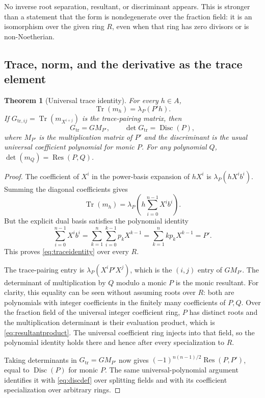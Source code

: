 \documentclass[11pt,letterpaper]{article}
\numberwithin{equation}{section}
\newtheorem{theorem}{Theorem}[section]
\theoremstyle{definition}
\theoremstyle{remark}
\newcommand{\Res}{\operatorname{Res}}
\newcommand{\Disc}{\operatorname{Disc}}
\newcommand{\Tr}{\operatorname{Tr}}
\begin{document}
No inverse root separation, resultant, or discriminant appears. This is
stronger than a statement that the form is nondegenerate over the fraction
field: it is an isomorphism over the given ring $R$, even when that ring
has zero divisors or is non-Noetherian.

\subsection{Trace, norm, and the derivative as the trace element}
\begin{theorem}[Universal trace identity]\label{thm:trace}
For every $h\in A$,
\begin{equation}\label{eq:traceidentity}
 \Tr(m_h)=\lambda_P(P'h).
\end{equation}
If $G_{\mathrm{tr},ij}=\Tr(m_{X^{i+j}})$ is the trace-pairing matrix,
then
\begin{equation}\label{eq:tracegram}
 G_{\mathrm{tr}}=G M_{P'},\qquad
 \det G_{\mathrm{tr}}=\Disc(P),
\end{equation}
where $M_{P'}$ is the multiplication matrix of $P'$ and the discriminant
is the usual universal coefficient polynomial for monic $P$.
For any polynomial $Q$, $\det(m_Q)=\Res(P,Q)$.
\end{theorem}
\begin{proof}
The coefficient of $X^i$ in the power-basis expansion of $hX^i$ is
$\lambda_P(hX^ib^i)$. Summing the diagonal coefficients gives
\[
 \Tr(m_h)=\lambda_P\left(h\sum_{i=0}^{n-1}X^ib^i\right).
\]
But the explicit dual basis satisfies the polynomial identity
\begin{equation}\label{eq:eulerderivative}
 \sum_{i=0}^{n-1}X^ib^i
 =\sum_{k=1}^n\sum_{i=0}^{k-1}p_kX^{k-1}
 =\sum_{k=1}^n kp_kX^{k-1}=P'.
\end{equation}
This proves \eqref{eq:traceidentity} over every $R$.

The trace-pairing entry is $\lambda_P(X^iP'X^j)$, which is the $(i,j)$
entry of $GM_{P'}$. The determinant of multiplication by $Q$ modulo a
monic $P$ is the monic resultant. For clarity, this equality can be seen
without assuming roots over $R$: both are polynomials with integer
coefficients in the finitely many coefficients of $P,Q$. Over the
fraction field of the universal integer coefficient ring, $P$ has
distinct roots and the multiplication determinant is their evaluation
product, which is \eqref{eq:resultantproduct}. The universal coefficient
ring injects into that field, so the polynomial identity holds there and
hence after every specialization to $R$.

Taking determinants in $G_{\mathrm{tr}}=GM_{P'}$ now gives
$(-1)^{n(n-1)/2}\Res(P,P')$, equal to $\Disc(P)$ for monic $P$.
The same universal-polynomial argument identifies it with
\eqref{eq:discdef} over splitting fields and with its coefficient
specialization over arbitrary rings.
\end{proof}
\end{document}
